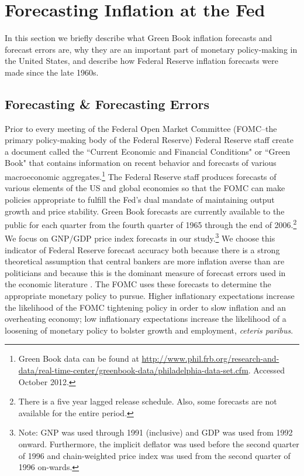 \documentclass[a4paper]{article}\usepackage{graphicx, color}
\begin{document}

\section{Forecasting Inflation at the Fed}

In this section we briefly describe what Green Book inflation forecasts and forecast errors are, why they are an important part of monetary policy-making in the United States, and describe how Federal Reserve inflation forecasts were made since the late 1960s.

\subsection{Forecasting \& Forecasting Errors}

Prior to every meeting of the Federal Open Market Committee (FOMC--the primary policy-making body of the Federal Reserve) Federal Reserve staff create a document called the ``Current Economic and Financial Conditions" or ``Green Book" that contains information on recent behavior and forecasts of various macroeconomic aggregates.\footnote{Green Book data can be found at {\url{http://www.phil.frb.org/research-and-data/real-time-center/greenbook-data/philadelphia-data-set.cfm}}. Accessed October 2012.} The Federal Reserve staff produces forecasts of various elements of the US and global economies so that the FOMC can make policies appropriate to fulfill the Fed's dual mandate of maintaining output growth and price stability. Green Book forecasts are currently available to the public for each quarter from the fourth quarter of 1965 through the end of 2006.\footnote{There is a five year lagged release schedule. Also, some forecasts are not available for the entire period.}  We focus on GNP/GDP price index forecasts in our study.\footnote{Note: GNP was used through 1991 (inclusive) and GDP was used from 1992 onward. Furthermore, the implicit deflator was used before the second quarter of 1996 and chain-weighted price index was used from the second quarter of 1996 on-wards.} We choose this indicator of Federal Reserve forecast accuracy both because there is a strong theoretical assumption that central bankers are more inflation averse than are politicians \citep{Cukierman1992,Mukherjee2008,Tillmann2008} and because this is the dominant measure of forecast errors used in the economic literature \citep[c.f.][]{Romer2000}. The FOMC uses these forecasts to determine the appropriate monetary policy to pursue. Higher inflationary expectations increase the likelihood of the FOMC tightening policy in order to slow inflation and an overheating economy; low inflationary expectations increase the likelihood of a loosening of monetary policy to bolster growth and employment, \emph{ceteris paribus}.
\end{document}
